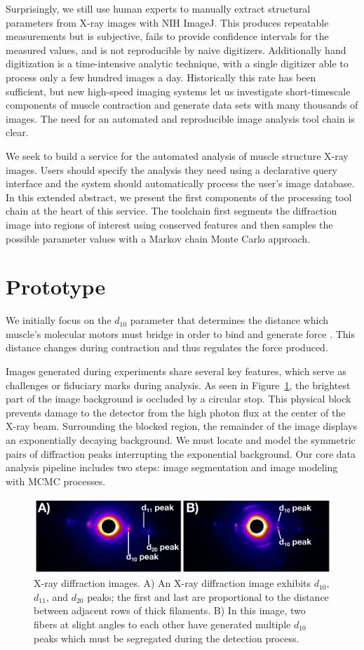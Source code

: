 \documentclass{sig-alternate}
\newcommand{\figureimgs}{
\begin{figure}[tbp]
  \centering
  \includegraphics[width=\linewidth]{figures/x_ray_image_montage}
  \vspace{-12pt}
  \caption{\label{fig:imgs}
  	X-ray diffraction images.
    A) An X-ray diffraction image exhibits $d_{10}$, $d_{11}$, and
    $d_{20}$ peaks; the first and last are proportional to the
    distance between adjacent rows of thick filaments. B) In this
    image, two fibers at slight angles to each other have generated
    multiple $d_{10}$ peaks which must be segregated during the
    detection process.  
	}
	\vspace{-2pt}
\end{figure}
}
\begin{document}
Surprisingly, we still use human experts to manually extract
structural parameters from X-ray images with NIH ImageJ. This produces
repeatable measurements but is subjective, fails to provide confidence
intervals for the measured values, and is not reproducible by naive
digitizers. Additionally hand digitization is a time-intensive
analytic technique, with a single digitizer able to process only a few
hundred images a day.  Historically this rate has been sufficient, but
new high-speed imaging systems let us investigate short-timescale
components of muscle contraction and generate data sets with many
thousands of images. The need for an automated and reproducible image
analysis tool chain is clear. 

We seek to build a service for the automated analysis of muscle
structure X-ray images. Users should specify the analysis they need
using a declarative query interface and the system should
automatically process the user's image database. In this extended
abstract, we present the first components of the processing tool chain
at the heart of this service. The toolchain first segments the
diffraction image into regions of interest using conserved features
and then samples the possible parameter values with a Markov chain
Monte Carlo approach.


\section{Prototype}
\label{sec:proto}


We initially focus on the $d_{10}$ parameter that determines the
distance which muscle's molecular motors must bridge in order to bind
and generate force \cite{Williams2013}. This distance changes during
contraction and thus regulates the force produced.

Images generated during experiments share several key features, which
serve as challenges or fiduciary marks during analysis. As seen in
Figure~\ref{fig:imgs}, the brightest part of the image background is
occluded by a circular stop. This physical block prevents damage to
the detector from the high photon flux at the center of the X-ray
beam. Surrounding the blocked region, the remainder of the image
displays an exponentially decaying background. We must locate and
model the symmetric pairs of diffraction peaks interrupting the
exponential background. Our core data analysis pipeline includes two
steps: image segmentation and image modeling with MCMC processes.

\figureimgs
\end{document}
